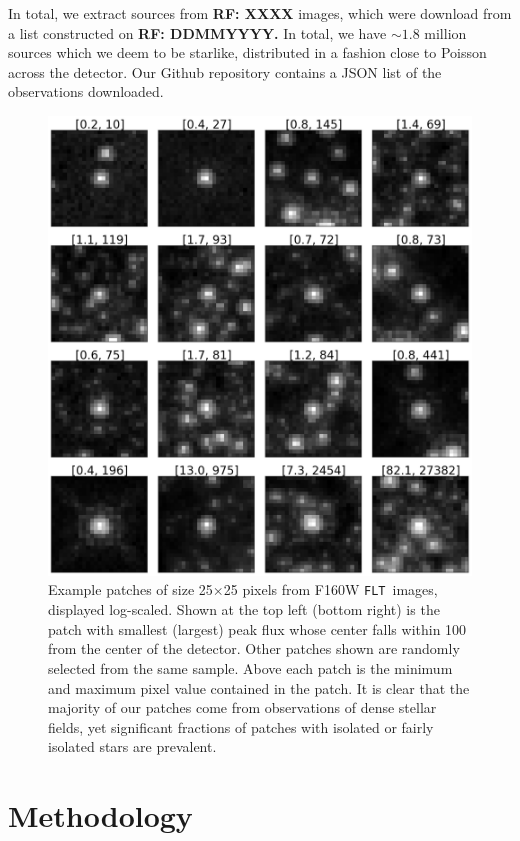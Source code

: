 \documentclass[12pt,letterpaper,preprint]{aastex}
\newcommand{\rf}[1]{\textbf{RF: #1}}
\newcommand{\FLT}{\texttt{FLT}}
\begin{document}
In total, we extract sources from \rf{XXXX} images, which were download from a list constructed on 
\rf{DDMMYYYY.}  In total, we have $\sim1.8$ million sources which we deem to be starlike, distributed 
in a fashion close to Poisson across the detector.  Our Github repository contains a JSON list of the
observations downloaded.

\begin{figure}
\centering
 \includegraphics[clip=true, trim=0cm 0cm 0.0cm 0.cm,width=12cm]{../plots/paper_figs/fig1.png}
\caption{Example patches of size 25$\times$25 pixels from F160W \FLT\, images, displayed log-scaled.
Shown at the top left (bottom right) is the patch with smallest (largest) peak flux whose center falls within
100 from the center of the detector.  Other patches shown are randomly selected from the same sample.
Above each patch is the minimum and maximum pixel value contained in the patch.
It is clear that the majority of our patches come from observations of dense stellar fields, yet significant 
fractions of patches with isolated or fairly isolated stars are prevalent.}
\label{fig:data-examples}
\end{figure}



\section{Methodology}
\end{document}
